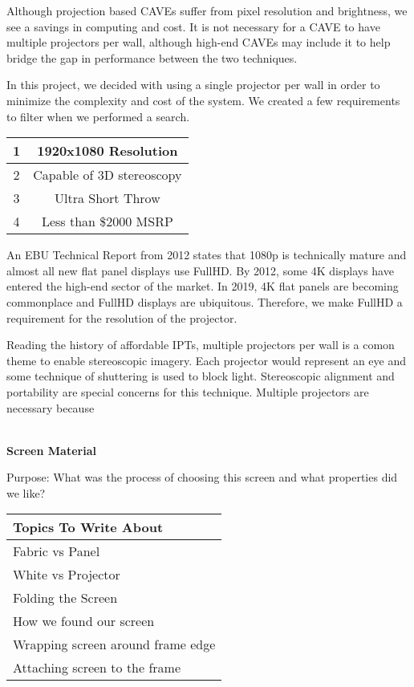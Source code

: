Although projection based CAVEs suffer from pixel resolution and brightness, we see a savings in computing and cost. It is not necessary for a CAVE to have multiple projectors per wall, although high-end CAVEs may include it to help bridge the gap in performance between the two techniques.

In this project, we decided with using a single projector per wall in order to minimize the complexity and cost of the system. We created a few requirements to filter when we performed a search.

\begin{center}
	\begin{tabular}{|c|c|}
		\hline 
		1 & 1920x1080 Resolution \\ 
		\hline 
		2 & Capable of 3D stereoscopy \\ 
		\hline 
		3 & Ultra Short Throw \\ 
		\hline 
		4 & Less than \$2000 MSRP \\ 
		\hline 
	\end{tabular} 
\end{center}

An EBU Technical Report from 2012 states that 1080p is technically mature and almost all new flat panel displays use FullHD. By 2012, some 4K displays have entered the high-end sector of the market. \cite{ebuHDTVRef} In 2019, 4K flat panels are becoming commonplace and FullHD displays are ubiquitous. Therefore, we make FullHD a requirement for the resolution of the projector.

Reading the history of affordable IPTs, multiple projectors per wall is a comon theme to enable stereoscopic imagery. Each projector would represent an eye and some technique of shuttering is used to block light. Stereoscopic alignment and portability are special concerns for this technique. Multiple projectors are necessary because 

\label{sec:hwScreensSection}\\

\filbreak
\noindent\textbf{Screen Material} \\
\begin{center}
	\textcolor{OliveGreen}{Purpose: What was the process of choosing this screen and what properties did we like?}
	
	\begin{table}[H]
		\centering
		\renewcommand\arraystretch{0.5}
		\begin{tabular}{|l|}
			\hline 
			Topics To Write About \\ 
			\hline 
			Fabric vs Panel \\  
			White vs Projector \\
			Folding the Screen \\
			How we found our screen \\
			Wrapping screen around frame edge \\
			Attaching screen to the frame \\ 
			\hline 
		\end{tabular}
	\end{table}
\end{center}


